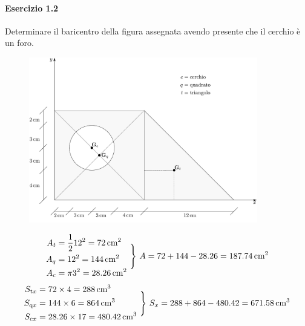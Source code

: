 \paragraph{Esercizio 1.2}
Determinare il baricentro della figura assegnata avendo presente che il cerchio è un foro. 
\renewcommand{\thefigure}{1.2~-~1}
\begin{figure}[h]
\centering
\includegraphics[width=0.89\textwidth]{Immagini/Parte_1/Esercizio1_2/Esercizio1_2_1.pdf}
\caption{}
\label{Esercizio1_2}
\end{figure}
\begin{equation*}
\begin{aligned}
A_t &= \frac{1}{2}12^2 = 72\,\textup{cm}^2 \\
A_q &= 12^2 = 144\,\textup{cm}^2 \\
A_c &= \pi3^2 = 28.26\,\textup{cm}^2
\end{aligned}
\,\,\Biggr\}\,\, A = 72+144-28.26 = 187.74\,\textup{cm}^2
\end{equation*}
\begin{equation*}
\begin{aligned}
S_{\textup{t}x} &= 72\times 4 = 288\,\textup{cm}^3 \\
S_{\textup{q}x} &= 144\times 6 = 864\,\textup{cm}^3 \\
S_{\textup{c}x} &= 28.26\times 17  = 480.42\,\textup{cm}^3
\end{aligned}
\,\,\Biggr\}\,\, S_x = 288+864-480.42 = 671.58\,\textup{cm}^3
\end{equation*}
